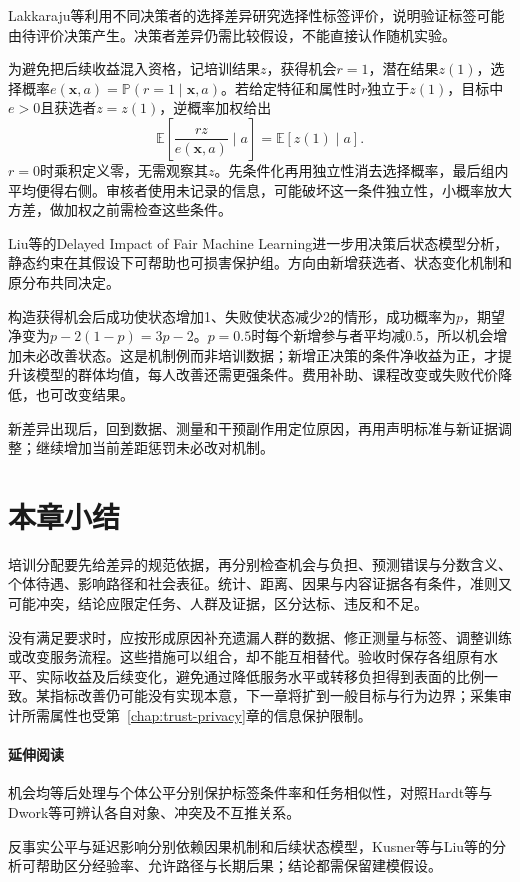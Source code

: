 Lakkaraju等利用不同决策者的选择差异研究选择性标签评价，说明验证标签可能由待评价决策产生。决策者差异仍需比较假设，不能直接认作随机实验。

为避免把后续收益混入资格，记培训结果$z$，获得机会$r=1$，潜在结果$z(1)$，选择概率$e(\bm{x},a)=\mathbb P(r=1\mid\bm{x},a)$。若给定特征和属性时$r$独立于$z(1)$，目标中$e>0$且获选者$z=z(1)$，逆概率加权给出
\begin{equation}
 \mathbb E\!\left[\frac{r z}{e(\bm{x},a)}\mid a\right]
 =\mathbb E[z(1)\mid a].
 \label{eq:fairness-selective-weight}
\end{equation}
$r=0$时乘积定义零，无需观察其$z$。先条件化再用独立性消去选择概率，最后组内平均便得右侧。审核者使用未记录的信息，可能破坏这一条件独立性，小概率放大方差，做加权之前需检查这些条件。

Liu等的Delayed Impact of Fair Machine Learning进一步用决策后状态模型分析，静态约束在其假设下可帮助也可损害保护组。方向由新增获选者、状态变化机制和原分布共同决定。

构造获得机会后成功使状态增加1、失败使状态减少2的情形，成功概率为$p$，期望净变为$p-2(1-p)=3p-2$。$p=0.5$时每个新增参与者平均减0.5，所以机会增加未必改善状态。这是机制例而非培训数据；新增正决策的条件净收益为正，才提升该模型的群体均值，每人改善还需更强条件。费用补助、课程改变或失败代价降低，也可改变结果。

新差异出现后，回到数据、测量和干预副作用定位原因，再用声明标准与新证据调整；继续增加当前差距惩罚未必改对机制。

\section{本章小结}
\label{sec:fairness-summary}

培训分配要先给差异的规范依据，再分别检查机会与负担、预测错误与分数含义、个体待遇、影响路径和社会表征。统计、距离、因果与内容证据各有条件，准则又可能冲突，结论应限定任务、人群及证据，区分达标、违反和不足。

没有满足要求时，应按形成原因补充遗漏人群的数据、修正测量与标签、调整训练或改变服务流程。这些措施可以组合，却不能互相替代。验收时保存各组原有水平、实际收益及后续变化，避免通过降低服务水平或转移负担得到表面的比例一致。某指标改善仍可能没有实现本意，下一章将扩到一般目标与行为边界；采集审计所需属性也受第~\ref{chap:trust-privacy}章的信息保护限制。

\paragraph{延伸阅读}

机会均等后处理与个体公平分别保护标签条件率和任务相似性，对照Hardt等与Dwork等可辨认各自对象、冲突及不互推关系。

反事实公平与延迟影响分别依赖因果机制和后续状态模型，Kusner等与Liu等的分析可帮助区分经验率、允许路径与长期后果；结论都需保留建模假设。
